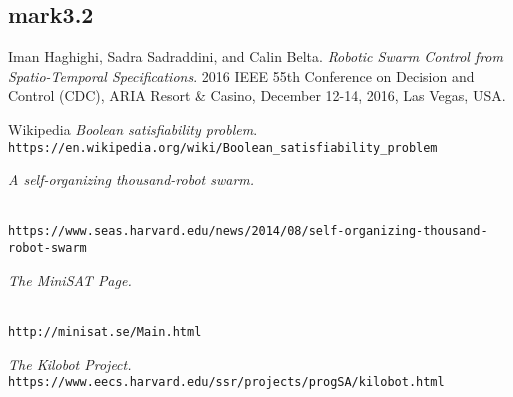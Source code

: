 \documentclass{article}[11pt]
\begin{document}
		\subsection{mark3.2}

		\begin{thebibliography}{9}
			Iman Haghighi, Sadra Sadraddini, and Calin Belta. 
			\textit{Robotic  Swarm  Control  from  Spatio-Temporal  Specifications}.
			2016 IEEE 55th Conference on Decision and Control (CDC), ARIA Resort \& Casino, December 12-14, 2016, Las Vegas, USA. 			
			
			Wikipedia
			\textit{Boolean satisfiability problem}. \\
			\texttt{https://en.wikipedia.org/wiki/Boolean\_satisfiability\_problem} 
			
			\author{Caroline Perry.}
			\textit{A self-organizing thousand-robot swarm.}
			\date{August 14, 2014.} \\
			\texttt{https://www.seas.harvard.edu/news/2014/08/self-organizing-thousand-robot-swarm}
			
			\textit{The MiniSAT Page.}
			\author{Niklas EÃ©n, Niklas SÃ¶rensson} \\
			\texttt{http://minisat.se/Main.html}

			\author{Self Organizing Systems Research Group.}
			\textit{The Kilobot Project.}
			\texttt{https://www.eecs.harvard.edu/ssr/projects/progSA/kilobot.html}
		\end{thebibliography}
\end{document}
